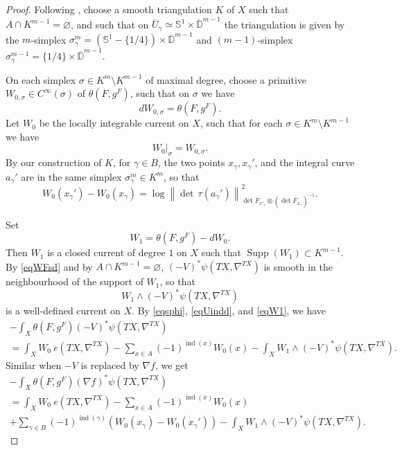 \documentclass[JEP,XML,SOM,Unicode]{cedram}
\theoremstyle{plain}
\theoremstyle{definition}
\theoremstyle{remark}
\newcommand{\bbD}{\mathbb{D}}
\newcommand{\bbS}{\mathbb{S}}
\DeclareMathOperator{\ind}{ind}
\DeclareMathOperator{\Supp}{Supp}
\let\ol\overline
\begin{document}
\begin{proof}
Following \cite[\S IV.c)]{BZ92},
choose a smooth triangulation $K$ of $X$ such that $A\cap
K^{m-1}=\varnothing$, and such that on $\ol{U}_{\gamma}\simeq \bbS^{1}\times
\ol{\bbD}^{m-1}$ the
triangulation is given by the $m$-simplex
$\sigma^{m}_{\gamma}=(\bbS^{1}-\{1/4\})\times
\ol{\bbD}^{m-1}$ and $(m-1)$-simplex
$\sigma^{m-1}_{\gamma}=\{1/4\}\times \ol{\bbD}^{m-1}$.

On each simplex $\sigma\in K^{m}\setminus K^{m-1}$ of maximal degree, choose a
primitive $W_{0,\sigma}\in C^{\infty}(\sigma)$ of $\theta(F,g^{F})$,
such that on $\sigma$ we have
\begin{equation*}
dW_{0,\sigma}=\theta(F,g^{F}).
\end{equation*}
Let $W_{0}$ be the locally integrable current on $X$, such that
for each $\sigma\in K^{m}\setminus K^{m-1}$ we have
\begin{equation*}
W_{0}|_{\sigma}=W_{0,\sigma}.
\end{equation*}
By our construction of $K$, for $\gamma\in B$, the two points
$x_{\gamma},x_{\gamma}'$, and the integral curve $a_{\gamma}'$ are in the same simplex $\sigma^{m}_{\gamma}\in
K^{m}$, so that
\begin{equation}\label{W0W0}
W_{0}(x_{\gamma}')-W_{0}(x_{\gamma})=\log
\left\|{\det\,}\tau(a_{\gamma}')\right\|^{2}_{\det
F_{x'_{\gamma}}\otimes (\det
F_{x_{\gamma}})^{-1}}.
\end{equation}

Set
\begin{equation}\label{eqW1}
W_{1}=\theta(F,g^{F})-dW_{0}.
\end{equation}
Then $W_{1}$ is a closed
current of degree $1$ on $X$ such that $\Supp(W_{1})\subset
K^{m-1}$. By \eqref{eqWFsd} and by $A\cap K^{m-1}=\varnothing$, $(-V)^{*}\psi(TX,\nabla^{TX})$ is
smooth in the neighbourhood of the support of $W_{1}$, so that
\begin{equation*}
W_{1}\wedge (-V)^{*}\psi(TX,\nabla^{TX})
\end{equation*}
is a well-defined current on $X$. By \eqref{eqsphi}, \eqref{eqUindd}, and \eqref{eqW1}, we have
\begin{multline}\label{eqVtoW1}
-\int_{X}\theta(F,g^{F}) (-V)^{*}\psi(TX,\nabla^{TX})\\
=\int_{X}W_{0}\ e(TX,\nabla^{TX})
-\sum_{x\in A}(-1)^{\ind(x)}W_{0}(x)
-\int_{X}W_{1}\wedge (-V)^{*}\psi(TX,\nabla^{TX}).
\end{multline}
Similar when $-V$ is replaced by $\nabla f$, we get
\begin{multline}\label{eqnftoW1}
-\int_{X}\theta(F,g^{F}) (\nabla f)^{*}\psi(TX,\nabla^{TX})\\
=\int_{X}W_{0}\ e(TX,\nabla^{TX})
-\sum_{x\in A}(-1)^{\ind(x)}W_{0}(x)\\
+\sum_{\gamma\in
B}(-1)^{\ind(\gamma)}(W_{0}(x_{\gamma})-W_{0}(x_{\gamma}')) -\int_{X}W_{1}\wedge (-V)^{*}\psi(TX,\nabla^{TX}).
\end{multline}


\end{proof}
\end{document}
